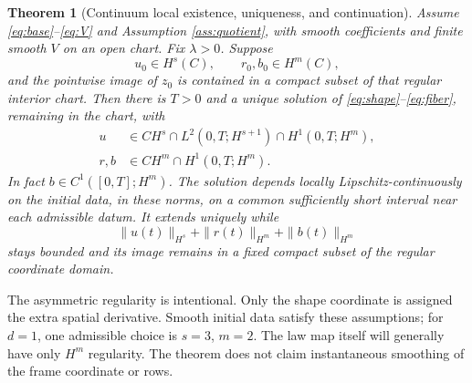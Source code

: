 \documentclass[11pt]{article}
\newtheorem{theorem}{Theorem}
\begin{document}
\begin{theorem}[Continuum local existence, uniqueness, and continuation]
Assume \eqref{eq:base}--\eqref{eq:V} and Assumption \ref{ass:quotient}, with smooth coefficients and finite smooth $V$ on an open chart. Fix $\lambda>0$. Suppose
\begin{equation}
 u_0\in H^s(C),\qquad r_0,b_0\in H^m(C),
 \label{eq:initial}
\end{equation}
and the pointwise image of $z_0$ is contained in a compact subset of that regular interior chart. Then there is $T>0$ and a unique solution of \eqref{eq:shape}--\eqref{eq:fiber}, remaining in the chart, with
\begin{align}
 u&\in CH^s\cap L^2(0,T;H^{s+1})\cap H^1(0,T;H^m),\label{eq:ureg}\\
 r,b&\in CH^m\cap H^1(0,T;H^m).\label{eq:rbreg}
\end{align}
In fact $b\in C^1([0,T];H^m)$. The solution depends locally Lipschitz-continuously on the initial data, in these norms, on a common sufficiently short interval near each admissible datum. It extends uniquely while
\begin{equation}
 \|u(t)\|_{H^s}+\|r(t)\|_{H^m}+\|b(t)\|_{H^m}
 \label{eq:continuation}
\end{equation}
stays bounded and its image remains in a fixed compact subset of the regular coordinate domain.
\label{thm:local}
\end{theorem}

The asymmetric regularity is intentional. Only the shape coordinate is assigned the extra spatial derivative. Smooth initial data satisfy these assumptions; for $d=1$, one admissible choice is $s=3$, $m=2$. The law map itself will generally have only $H^m$ regularity. The theorem does not claim instantaneous smoothing of the frame coordinate or rows.
\end{document}
